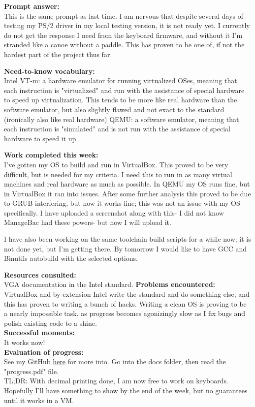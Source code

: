 \documentclass[11pt]{article}
\begin{document}
\textbf{Prompt answer:}\\
This is the same prompt as last time. I am nervous that despite several days of testing my PS/2 driver in my local testing version, it is not ready yet. I currently do not get the response I need from the keyboard firmware, and without it I'm stranded like a canoe without a paddle. This has proven to be one of, if not the hardest part of the project thus far.

\textbf{Need-to-know vocabulary:}\\
Intel VT-m: a hardware emulator for running virtualized OSes, meaning that each instruction is "virtualized" and run with the assistance of special hardware to speed up virtualization. This tends to be more like real hardware than the software emulator, but also slightly flawed and not exact to the standard (ironically also like real hardware)
QEMU: a software emulator, meaning that each instruction is "simulated" and is not run with the assistance of special hardware to speed it up

\textbf{Work completed this week:}\\
I've gotten my OS to build and run in VirtualBox. This proved to be very difficult, but is needed for my criteria. I need this to run in as many virtual machines and real hardware as much as possible. In QEMU my OS runs fine, but in VirtualBox it ran into issues. After some further analysis this proved to be due to GRUB interfering, but now it works fine; this was not an issue with my OS specifically. I have uploaded a screenshot along with this- I did not know ManageBac had these powers- but now I will upload it.

I have also been working on the same toolchain build scripts for a while now; it is not done yet, but I'm getting there. By tomorrow I would like to have GCC and Binutils autobuild with the selected options.

\textbf{Resources consulted:}\\
VGA documentation in the Intel standard.
\textbf{Problems encountered:}\\
VirtualBox and by extension Intel write the standard and do something else, and this has proven to writing a bunch of hacks. Writing a clean OS is proving to be a nearly impossible task, as progress becomes agonizingly slow as I fix bugs and polish existing code to a shine.\\
\textbf{Successful moments:}\\
It works now!\\
\textbf{Evaluation of progress:}\\
See my GitHub \href{https://github.com/cats64/ibpersonalproject}{here} for more into. Go into the docs folder, then read the "progress.pdf" file.\\
TL;DR: With decimal printing done, I am now free to work on keyboards. Hopefully I'll have something to show by the end of the week, but no guarantees until it works in a VM.
\end{document}
